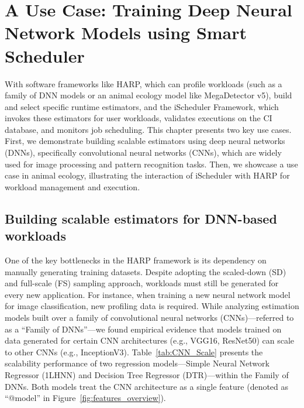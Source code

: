 \chapter{A Use Case: Training Deep Neural Network Models using Smart Scheduler}
\label{UseCase.ch}

With software frameworks like HARP, which can profile workloads (such as a family of DNN models or an animal ecology model like MegaDetector v5), build and select specific runtime estimators, and the iScheduler Framework, which invokes these estimators for user workloads, validates executions on the CI database, and monitors job scheduling. This chapter presents two key use cases. First, we demonstrate building scalable estimators using deep neural networks (DNNs), specifically convolutional neural networks (CNNs), which are widely used for image processing and pattern recognition tasks. Then, we showcase a use case in animal ecology, illustrating the interaction of iScheduler with HARP for workload management and execution.


\section{Building scalable estimators for DNN-based workloads}
\label{ScaleEstimator}

One of the key bottlenecks in the HARP framework is its dependency on manually generating training datasets. Despite adopting the scaled-down (SD) and full-scale (FS) sampling approach, workloads must still be generated for every new application. For instance, when training a new neural network model for image classification, new profiling data is required.
While analyzing estimation models built over a family of convolutional neural networks (CNNs)—referred to as a “Family of DNNs”—we found empirical evidence that models trained on data generated for certain CNN architectures (e.g., VGG16, ResNet50) can scale to other CNNs (e.g., InceptionV3).
Table~\ref{tab:CNN_Scale} presents the scalability performance of two regression models—Simple Neural Network Regressor (1LHNN) and Decision Tree Regressor (DTR)—within the Family of DNNs. Both models treat the CNN architecture as a single feature (denoted as “@model” in Figure~\ref{fig:features_overview}). 

